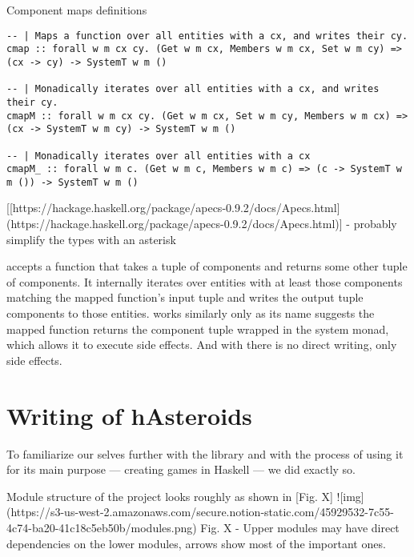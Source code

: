 \documentclass[
  digital, %
  table,   %
  twoside, %
  lof,     %
  lot,     %
]{fithesis3}
\begin{document}
\begin{listing}
\label{lst:cmaps}
\caption{Component maps definitions}
\begin{verbatim}
-- | Maps a function over all entities with a cx, and writes their cy.
cmap :: forall w m cx cy. (Get w m cx, Members w m cx, Set w m cy) => (cx -> cy) -> SystemT w m ()

-- | Monadically iterates over all entities with a cx, and writes their cy.
cmapM :: forall w m cx cy. (Get w m cx, Set w m cy, Members w m cx) => (cx -> SystemT w m cy) -> SystemT w m ()

-- | Monadically iterates over all entities with a cx
cmapM_ :: forall w m c. (Get w m c, Members w m c) => (c -> SystemT w m ()) -> SystemT w m ()
\end{verbatim}
\end{listing}

[[https://hackage.haskell.org/package/apecs-0.9.2/docs/Apecs.html](https://hackage.haskell.org/package/apecs-0.9.2/docs/Apecs.html)] - probably simplify the types with an asterisk

 accepts a function that takes a tuple of components
and returns some other tuple of components. It internally iterates
over entities with at least those components matching the mapped
function's input tuple and writes the output tuple components
to those entities.  works similarly
only as its name suggests the mapped function returns the component
tuple wrapped in the system monad, which allows it to execute side effects.
And with  there is no direct writing, only side effects.



\section{Writing of hAsteroids}
To familiarize our selves further with the library and with the process
of using it for its main purpose — creating games in Haskell — we did exactly so.

Module structure of the project looks roughly as shown in [Fig. X]
![img](https://s3-us-west-2.amazonaws.com/secure.notion-static.com/45929532-7c55-4c74-ba20-41c18c5eb50b/modules.png)
Fig. X - Upper modules may have direct dependencies on the lower modules, arrows show most of the important ones.
\end{document}
